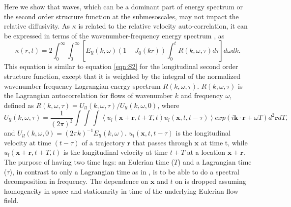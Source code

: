 \documentclass[]{ametsoc}
\begin{document}
\appendix[C]
Here we show that waves, which can be a dominant part of energy spectrum or the second order structure function at the submesoscales, may not impact the relative diffusivity. As $\kappa$ is related to the relative velocity auto-correlation, it can be expressed in terms of the wavenumber-frequency energy spectrum \citep{bennett1984relative, babiano1990relative}, as 
\begin{equation}
    \kappa(r,t) = 2\int_0^\infty \int_0^\infty \left[ E_{ll}(k, \omega)  (1- J_0(kr)) \int_0^t R(k, \omega,\tau) d\tau \right] d\omega dk.
    \label{eqn:diff_spectrum}
\end{equation}
This equation is similar to equation \ref{eqn:S2} for the longitudinal second order structure function, except that it is weighted by the integral of the normalized wavenumber-frequency
 Lagrangian energy spectrum $R(k, \omega, \tau)$. $R(k, \omega, \tau)$ is the Lagrangian autocorrelation for flows of wavenumber $k$ and frequency $\omega$, defined as $R(k, \omega, \tau) = U_{ll}(k, \omega , \tau) /U_{ll}(k, \omega , 0)$, where
\begin{equation}
    U_{ll}(k, \omega , \tau) = \frac{1}{(2\pi)^3} \int \int \int \left< u_l (\mathbf{x} + \mathbf{r}, t + T, t) u_l (\mathbf{x}, t , t - \tau)\right> exp(i \mathbf{k}\cdot \mathbf{r} + \omega T)  d^2 \mathbf{r} dT,
    \label{eqn:lag_autocorr}
\end{equation}
and $U_{ll}(k, \omega , 0) = (2\pi k)^{-1} E_{ll}(k,\omega)$. $u_l (\mathbf{x}, t , t - \tau)$ is the longitudinal velocity at time $(t - \tau)$ of a trajectory $\mathbf{r}$ that passes through $\mathbf{x}$ at time t, while $u_l (\mathbf{x} + \mathbf{r}, t + T , t )$ is the longitudinal velocity at time $t+T$ at a location $\mathbf{x}+\mathbf{r}$. The purpose of having two time lags: an Eulerian time ($T$) and a
Lagrangian time ($\tau$), in contrast to only a Lagrangian time as in \citet{bennett1984relative}, is to be able to do a spectral decomposition in frequency. The dependence on $\mathbf{x}$ and $t$ on is dropped assuming homogeneity in space and stationarity in time of the underlying Eulerian flow field. 
\end{document}
